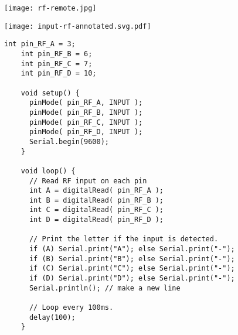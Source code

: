 \vspace{0.1in}
\begin{minipage}[t]{0.49\tw}

  \vspace{0.0in}
  \texttt{[image: rf-remote.jpg]}

  \vspace{0.0in}
  \texttt{[image: input-rf-annotated.svg.pdf]}

\end{minipage}
\hfill
\begin{minipage}[t]{0.49\tw}
  \begin{Verbatim}[gobble=3,fontsize=\small]
    int pin_RF_A = 3;
    int pin_RF_B = 6;
    int pin_RF_C = 7;
    int pin_RF_D = 10;

    void setup() {
      pinMode( pin_RF_A, INPUT );
      pinMode( pin_RF_B, INPUT );
      pinMode( pin_RF_C, INPUT );
      pinMode( pin_RF_D, INPUT );
      Serial.begin(9600);
    }

    void loop() {
      // Read RF input on each pin
      int A = digitalRead( pin_RF_A );
      int B = digitalRead( pin_RF_B );
      int C = digitalRead( pin_RF_C );
      int D = digitalRead( pin_RF_D );

      // Print the letter if the input is detected.
      if (A) Serial.print("A"); else Serial.print("-");
      if (B) Serial.print("B"); else Serial.print("-");
      if (C) Serial.print("C"); else Serial.print("-");
      if (D) Serial.print("D"); else Serial.print("-");
      Serial.println(); // make a new line

      // Loop every 100ms.
      delay(100);
    }
  \end{Verbatim}
\end{minipage}
\vspace{0.1in}

